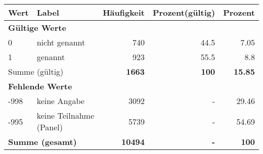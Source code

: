      \begin{longtable}{lXrrr}
     \toprule
     \textbf{Wert} & \textbf{Label} & \textbf{Häufigkeit} & \textbf{Prozent(gültig)} & \textbf{Prozent} \\
     \endhead
     \midrule
     \multicolumn{5}{l}{\textbf{Gültige Werte}}\\

     0 &
     \multicolumn{1}{X}{ nicht genannt   } &


       \num{740} &
       \num[round-mode=places,round-precision=2]{44,5} &
         \num[round-mode=places,round-precision=2]{7,05} \\

     1 &
     \multicolumn{1}{X}{ genannt   } &


       \num{923} &
       \num[round-mode=places,round-precision=2]{55,5} &
         \num[round-mode=places,round-precision=2]{8,8} \\
     \midrule
     \multicolumn{2}{l}{Summe (gültig)} &
       \textbf{\num{1663}} &
     \textbf{100} &
       \textbf{\num[round-mode=places,round-precision=2]{15,85}} \\
     \multicolumn{5}{l}{\textbf{Fehlende Werte}}\\
       -998 &
       keine Angabe &
         \num{3092} &
        - &
         \num[round-mode=places,round-precision=2]{29,46} \\
       -995 &
       keine Teilnahme (Panel) &
         \num{5739} &
        - &
         \num[round-mode=places,round-precision=2]{54,69} \\
     \midrule
     \multicolumn{2}{l}{\textbf{Summe (gesamt)}} &
          \textbf{\num{10494}} &
        \textbf{-} &
        \textbf{100} \\
     \bottomrule
     \end{longtable}
     

